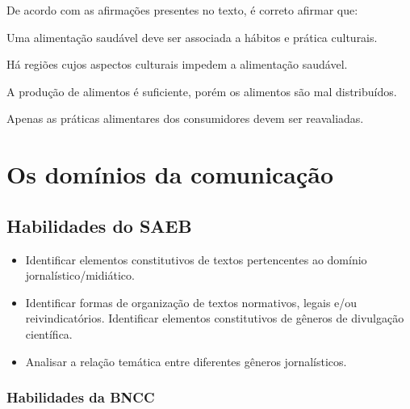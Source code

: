 
De acordo com as afirmações presentes no texto, é correto afirmar que:

\begin{escolha}

  \item Uma alimentação saudável deve ser associada a hábitos e prática culturais.
  
  \item Há regiões cujos aspectos culturais impedem a alimentação saudável.
  
  \item A produção de alimentos é suficiente, porém os alimentos são mal distribuídos.
  
  \item Apenas as práticas alimentares dos consumidores devem ser reavaliadas.

\end{escolha}

\chapter{Os domínios da comunicação}

\section{Habilidades do SAEB}

\begin{itemize}

  \item Identificar elementos constitutivos de textos pertencentes ao
domínio jornalístico/midiático.

  \item Identificar formas de organização de textos normativos, legais e/ou
reivindicatórios. Identificar elementos constitutivos de gêneros de
divulgação científica.

  \item Analisar a relação temática entre diferentes gêneros jornalísticos.

\end{itemize}

\subsection{Habilidades da BNCC}

